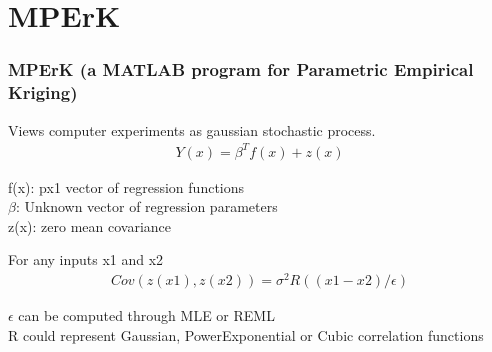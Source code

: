 \documentclass[10pt]{beamer}
\begin{document}
\section{MPErK}
\begin{frame}
\frametitle{MPErK (a MATLAB program for Parametric Empirical Kriging)}
Views computer experiments as gaussian stochastic process.\\
\begin{align*}
     Y(x)= \beta^Tf(x) + z(x)   
\end{align*}

\vspace{3mm}

 
f(x): px1 vector of regression functions\\
\(\beta\): Unknown vector of regression parameters\\
z(x): zero mean covariance 

\vspace{2mm}

For any inputs x1 and x2
\begin{align*}
     Cov(z(x1),z(x2))= \sigma^{2}R((x1-x2)/{\epsilon} )   
\end{align*}

\(\epsilon\) can be computed through MLE or REML\\
R could represent Gaussian, PowerExponential or Cubic correlation functions
\end{frame}

\end{document}
